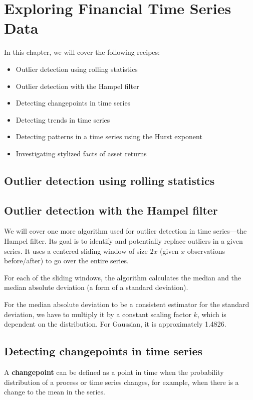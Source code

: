 \chapter{Exploring Financial Time Series Data\label{ch04}}
In this chapter, we will cover the following recipes:
\begin{itemize}
    \item Outlier detection using rolling statistics
    \item Outlier detection with the Hampel filter
    \item Detecting changepoints in time series
    \item Detecting trends in time series
    \item Detecting patterns in a time series using the Hurst exponent
    \item Investigating stylized facts of asset returns
\end{itemize}
\section{Outlier detection using rolling statistics}

\section{Outlier detection with the Hampel filter}
We will cover one more algorithm used for outlier detection in time series—the Hampel filter. Its goal is to identify and potentially replace outliers in a given series. It uses a centered sliding window of size $2x$ (given $x$ observations before/after) to go over the entire series.

For each of the sliding windows, the algorithm calculates the median and the median absolute deviation (a form of a standard deviation).

\begin{tcolorbox}
    For the median absolute deviation to be a consistent estimator for the standard deviation, we have to multiply it by a constant scaling factor $k$, which is dependent on the distribution. For Gaussian, it is approximately 1.4826.
\end{tcolorbox}

\section{Detecting changepoints in time series}
A \textbf{changepoint} can be defined as a point in time when the probability distribution of a process or time series changes, for example, when there is a change to the mean in the series.

